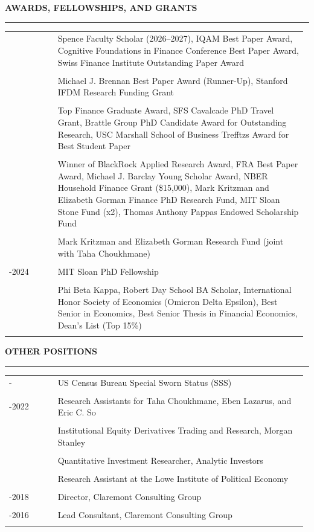 \documentclass[a4paper, 10pt]{article}
\makeatletter
\newcommand{\cvsec}[1]
{
	\needspace{4\baselineskip}
	\noindent \textbf{#1}
	
	\vspace{2pt}
	
	\hrule
	
	\bigskip
}
\newcommand{\cvitem}[2]{#1 & #2 \\ & \\}
\newenvironment{cvchrono}[1]
{
	\cvsec{#1}
	\begin{longtable}{@{}>{\raggedright\arraybackslash}p{0.16\linewidth}@{\hspace{0.02\linewidth}}>{\raggedright\arraybackslash}p{0.82\linewidth}@{}}
}
{
	\end{longtable}
}
\makeatother
\begin{document}
\begin{cvchrono}{AWARDS, FELLOWSHIPS, AND GRANTS}
	\cvitem{2026}{Spence Faculty Scholar (2026--2027), IQAM Best Paper Award, Cognitive Foundations in Finance Conference Best Paper Award, Swiss Finance Institute Outstanding Paper Award}
	\cvitem{2025}{Michael J. Brennan Best Paper Award (Runner-Up), Stanford IFDM Research Funding Grant}
	\cvitem{2024}{Top Finance Graduate Award, SFS Cavalcade PhD Travel Grant, Brattle Group PhD Candidate Award for Outstanding Research, USC Marshall School of Business Trefftzs Award for Best Student Paper}
	\cvitem{2023}{Winner of BlackRock Applied Research Award, FRA Best Paper Award, Michael J. Barclay Young Scholar Award, NBER Household Finance Grant (\$15,000), Mark Kritzman and Elizabeth Gorman Finance PhD Research Fund, MIT Sloan Stone Fund (x2), Thomas Anthony Pappas Endowed Scholarship Fund}
	\cvitem{2022}{Mark Kritzman and Elizabeth Gorman Research Fund (joint with Taha Choukhmane)}
	\cvitem{2018-2024}{MIT Sloan PhD Fellowship}
	\cvitem{2018}{Phi Beta Kappa, Robert Day School BA Scholar, International Honor Society of Economics (Omicron Delta Epsilon), Best Senior in Economics, Best Senior Thesis in Financial Economics, Dean's List (Top 15\%)}
\end{cvchrono}

\begin{cvchrono}{OTHER POSITIONS}
	\cvitem{2024-}{US Census Bureau Special Sworn Status (SSS)}
	\cvitem{2018-2022}{Research Assistants for Taha Choukhmane, Eben Lazarus, and Eric C. So}
	\cvitem{2017}{Institutional Equity Derivatives Trading and Research, Morgan Stanley}
	\cvitem{2016}{Quantitative Investment Researcher, Analytic Investors}
	\cvitem{2016}{Research Assistant at the Lowe Institute of Political Economy}
	\cvitem{2016-2018}{Director, Claremont Consulting Group}
	\cvitem{2015-2016}{Lead Consultant, Claremont Consulting Group}
\end{cvchrono}
\end{document}

